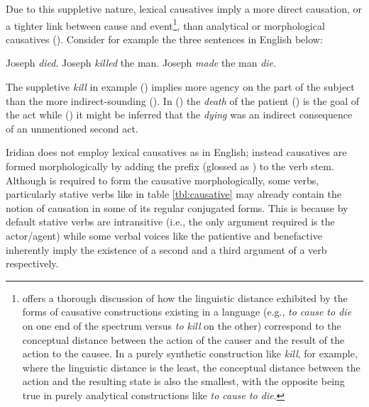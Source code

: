 Due to this suppletive nature, lexical causatives imply a more direct causation, or a tighter link between cause and event\footnote{\textcite{haiman1983} offers a thorough discussion of how the linguistic distance exhibited by the forms of causative constructions existing in a language (e.g., \emph{to cause to die} on one end of the spectrum versus \emph{to kill} on the other) correspond to the conceptual distance between the action of the causer and the result of the action to the causee. In a purely synthetic construction like \emph{kill}, for example, where the linguistic distance is the least, the conceptual distance between the action and the resulting state is also the smallest, with the opposite being true in purely analytical constructions like \emph{to cause to die}.}, than analytical or morphological causatives (\cite{velupillai2012, haiman1983}). Consider for example the three sentences in English below:


\pex
\a Joseph \emph{died}.
\a Joseph \emph{killed} the man.
\a Joseph \emph{made} the man \emph{die.}
\xe

The suppletive \emph{kill} in example () implies more agency on the part of the subject than the more indirect-sounding (). In () the \emph{death} of the patient () is the goal of the act while () it might be inferred that the \emph{dying} was an indirect consequence of an unmentioned second act.


Iridian does not employ lexical causatives as in English; instead causatives are formed morphologically by adding the prefix  (glossed as \Caus{}) to the verb stem. Although  is required to form the causative morphologically, some verbs, particularly stative verbs like  in table \ref{tbl:causative} may already contain the notion of causation in some of its regular conjugated forms. This is because by default stative verbs are intransitive (i.e., the only argument required is the actor/agent) while some verbal voices like the patientive and benefactive inherently imply the existence of a second and a third argument of a verb respectively.


